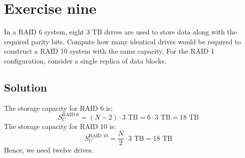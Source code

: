 \section{Exercise nine}

In a RAID 6 system, eight $3\text{ TB}$ drives are used to store data along with the required parity bits. 
Compute how many identical drives would be required to construct a RAID 10 system with the same capacity.
For the RAID 1 configuration, consider a single replica of data blocks.

\subsection*{Solution}
The storage capacity for RAID 6 is:
\[S_C^{\text{RAID 6}}=\left(N-2\right)\cdot3\text{ TB}=6\cdot 3\text{ TB}=18\text{ TB}\]
The storage capacity for RAID 10 is:
\[S_C^{\text{RAID 10}}=\dfrac{N}{2}\cdot3\text{ TB}=18\text{ TB}\]
Hence, we need twelve drives. 